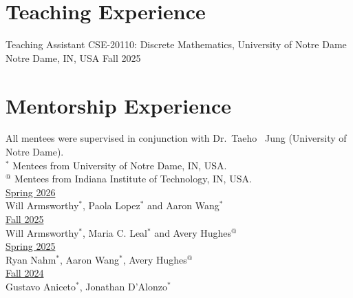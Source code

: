 \documentclass{academic-cv}
\begin{document}
\section{Teaching Experience}
\begin{cventries}
    \cventry
        {Teaching Assistant}
        {CSE-20110: Discrete Mathematics, University of Notre Dame}
        {Notre Dame, IN, USA}
        {Fall 2025}
\end{cventries}

\section{Mentorship Experience}
All mentees were supervised in conjunction with Dr.\ Taeho \ Jung (University of Notre Dame).\\
$^{*}$ Mentees from University of Notre Dame, IN, USA.\\
$^{@}$ Mentees from Indiana Institute of Technology, IN, USA.\\[0.3em]
\underline{Spring 2026}\\
Will Armsworthy$^{*}$, Paola Lopez$^{*}$ and Aaron Wang$^{*}$\\[0.3em]
\underline{Fall 2025}\\
Will Armsworthy$^{*}$, Maria C. Leal$^{*}$ and Avery Hughes$^{@}$\\[0.3em]
\underline{Spring 2025}\\
Ryan Nahm$^{*}$, Aaron Wang$^{*}$, Avery Hughes$^{@}$\\[0.3em]
\underline{Fall 2024}\\
Gustavo Aniceto$^{*}$, Jonathan D'Alonzo$^{*}$

\end{document}
